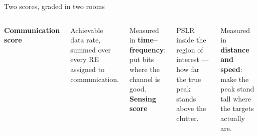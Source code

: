 \begin{frame}{Two scores, graded in two rooms}
  \vspace{0.6em}
  \begin{columns}[T,onlytextwidth]
      \large\textbf{\textcolor{ranblue}{Communication score}}

      \vspace{0.5em}
      \small
      Achievable data rate, summed over every RE assigned to communication.

      \vspace{0.5em}
      Measured in \textbf{time--frequency}: put bits where the channel is good.
      \large\textbf{\textcolor{coreorange}{Sensing score}}

      \vspace{0.5em}
      \small
      PSLR inside the region of interest --- how far the true peak stands above the clutter.

      \vspace{0.5em}
      Measured in \textbf{distance and speed}: make the peak stand tall where the
      targets actually are.
  \end{columns}

  \vspace{0.8em}
\end{frame}

